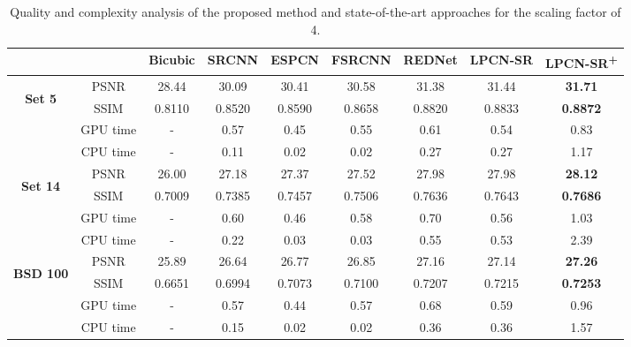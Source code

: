 \documentclass[10pt,twocolumn,letterpaper]{article}
\begin{document}
\begin{table*}[!b]
  \caption{Quality and complexity analysis of the proposed method and state-of-the-art approaches for the scaling factor of 4.}
  \vspace*{7pt}
\fontsize{9.25pt}{9.25pt}\selectfont
    \centering
    \begin{tabular}{ccccccccc}
    \toprule[1pt]
        &  & \bf{Bicubic} & \bf{SRCNN} & \bf{ESPCN} & \bf{FSRCNN}  & \bf{REDNet}  & \bf{LPCN-SR} & \bf{LPCN-SR\textsuperscript{+}}\\
        \midrule[1pt]
\multirow{4}{*}{\begin{turn}{90}\bf{Set 5}\end{turn}} & PSNR  &  28.44 & 30.09 & 30.41 & 30.58 & 31.38 & 31.44 & \bf{31.71} \\
                                                     & SSIM  &  0.8110 & 0.8520 & 0.8590 & 0.8658 & 0.8820 & 0.8833 & \bf{0.8872} \\
                                                     & GPU time & - & 0.57 & 0.45 & 0.55 & 0.61 & 0.54 & 0.83 \\  
                                                     & CPU time & - & 0.11 & 0.02 & 0.02 & 0.27 & 0.27 & 1.17 \\
        \midrule[1pt]
\multirow{4}{*}{\begin{turn}{90}\bf{Set 14}\end{turn}} & PSNR  &  26.00 & 27.18 & 27.37 & 27.52 & 27.98 & 27.98 & \bf{28.12} \\
                                                      & SSIM  & 0.7009 & 0.7385 & 0.7457 & 0.7506 & 0.7636 & 0.7643 & \bf{0.7686} \\
                                                      & GPU time & - & 0.60 & 0.46 & 0.58 & 0.70 & 0.56 & 1.03 \\
                                                      & CPU time & - & 0.22 & 0.03 & 0.03 & 0.55 & 0.53 & 2.39 \\
        \midrule[1pt]
\multirow{4}{*}{\begin{turn}{90}\bf{BSD 100}\end{turn}} & PSNR  &  25.89 & 26.64 & 26.77 & 26.85 & 27.16 & 27.14 & \bf{27.26} \\
                                                    & SSIM  & 0.6651 & 0.6994 & 0.7073 & 0.7100 & 0.7207 & 0.7215 & \bf{0.7253} \\ 
                                                    & GPU time & - & 0.57 & 0.44 & 0.57 & 0.68 & 0.59 & 0.96 \\
                                                    & CPU time & - & 0.15 & 0.02 & 0.02 & 0.36 & 0.36 & 1.57 \\
        \bottomrule[1pt]
     \end{tabular}
    \label{tab:results}
\end{table*}
\end{document}
